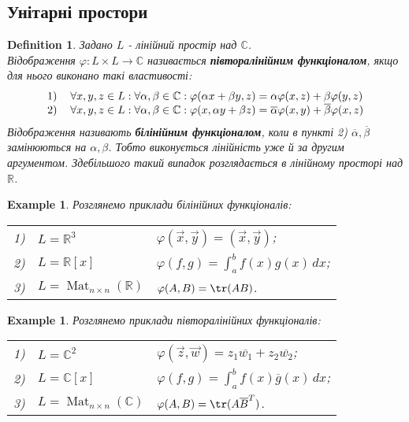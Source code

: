 \documentclass[a4paper, 10pt]{article}
\theoremstyle{theoremdd}
\newtheorem{definition}[theorem]{Definition}
\newtheorem{example}[theorem]{Example}
\DeclareMathOperator{\Mat}{Mat}
\begin{document}
\subsection{Унітарні простори}
\begin{definition}
Задано $L$ - лінійний простір над $\mathbb{C}$.\\
Відображення $\varphi \colon L \times L \to \mathbb{C}$ називається \textbf{півторалінійним функціоналом}, якщо для нього виконано такі властивості:
\begin{align*}
\begin{tabular}{cl}
1) & $\forall x,y,z \in L: \forall \alpha,\beta \in \mathbb{C}: \varphi (\alpha x + \beta y, z) = \alpha \varphi (x,z) + \beta \varphi (y,z)$\\
2) & $\forall x,y,z \in L: \forall \alpha, \beta \in \mathbb{C}: \varphi (x, \alpha y + \beta z) = \overline{\alpha} \varphi (x,y) + \overline{\beta} \varphi (x,z)$\\
	\end{tabular}
\end{align*}
Відображення називають \textbf{білінійним функціоналом}, коли в пункті 2) $\overline{\alpha},\overline{\beta}$ замінюються на $\alpha,\beta$. Тобто виконується лінійність уже й за другим аргументом. Здебільшого такий випадок розглядається в лінійному просторі над $\mathbb{R}$.
\end{definition}

\begin{example}
\label{bilinear_functional}
Розглянемо приклади білінійних функціоналів:\\
\begin{tabular}{cll}
1) & $L = \mathbb{R}^3$ & $\varphi(\vec{x},\vec{y}) = (\vec{x},\vec{y})$;\\
2) & $L = \mathbb{R}[x]$ & $\varphi(f,g) = \displaystyle \int_a^b f(x)g(x)\,dx$;\\
3) & $L = \Mat_{n \times n}(\mathbb{R})$ & $\varphi(A,B) = \tr(AB)$.
\end{tabular}
\end{example}

\begin{example}
\label{one_half_functional}
Розглянемо приклади півторалінійних функціоналів:\\
\begin{tabular}{cll}
1) & $L = \mathbb{C}^2$ & $\varphi(\vec{z},\vec{w}) = z_1 \overline{w_1} + z_2 \overline{w_2}$;\\
2) & $L = \mathbb{C}[x]$ & $\varphi(f,g) = \displaystyle \int_a^b f(x) \overline{g}(x)\,dx$;\\
3) & $L = \Mat_{n \times n}(\mathbb{C})$ & $\varphi(A,B) = \tr(A \overline{B}^T)$.
\end{tabular}
\end{example}
\end{document}
